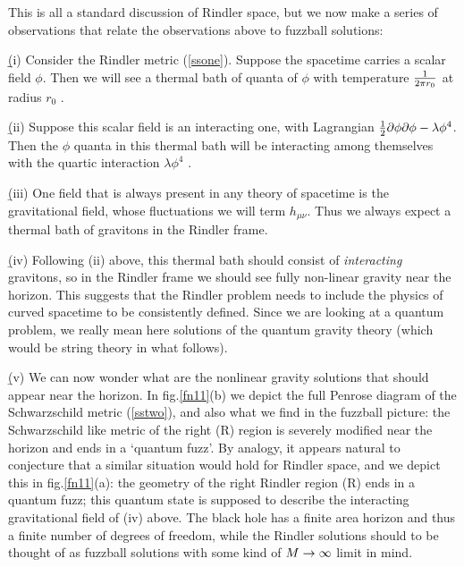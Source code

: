 \documentclass[12pt]{article}
\begin{document}
This is all a standard discussion of Rindler space, but we now make a series of observations that relate the observations above to fuzzball solutions:

\b









\b


(i) Consider the Rindler metric (\ref{ssone}). Suppose the spacetime carries  a scalar field $\phi$. Then we will see a thermal bath of quanta of $\phi$ with temperature ${1\over 2\pi r_0}$ at radius $r_0$ \cite{unruh}. 


\b

(ii) Suppose this scalar field is an interacting one, with Lagrangian ${1\over 2}\partial\phi\partial\phi-\lambda\phi^4$. Then the $\phi$ quanta in this thermal bath will be interacting among themselves with the quartic interaction $\lambda \phi^4$ \cite{unruh2}. 


\b

(iii) One field that is always present in any theory of spacetime is the gravitational field, whose fluctuations we will term $h_{\mu\nu}$. Thus we always expect a thermal bath of gravitons in the Rindler frame.


\b

(iv) Following (ii) above, this thermal bath should consist of {\it interacting} gravitons, so in the Rindler frame we should see fully non-linear gravity near the horizon. This suggests that the Rindler problem needs to include the physics of curved spacetime to be consistently defined. Since we are looking at a quantum problem, we really mean here solutions of the quantum gravity theory (which would be string theory in what follows). 


\b

(v) We can now wonder what are the nonlinear gravity solutions that should appear near the horizon. In fig.\ref{fn11}(b) we depict the full Penrose diagram of the Schwarzschild metric (\ref{sstwo}), and also what we find in the fuzzball picture: the Schwarzschild like metric of the right (R) region is severely modified near the horizon and ends in a `quantum fuzz'.  By analogy, it appears natural to conjecture that a similar situation would hold for Rindler space, and we depict this in fig.\ref{fn11}(a): the geometry of the right Rindler region (R) ends in a quantum fuzz; this quantum state is supposed to describe the interacting gravitational field of (iv) above. The black hole has a finite area horizon and thus a finite number of degrees of freedom, while the Rindler solutions should to be thought of as fuzzball solutions with some kind of $M\rightarrow\infty$ limit in mind. 
\end{document}
